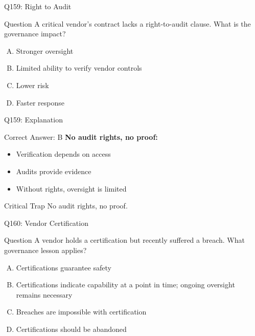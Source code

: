 \documentclass{beamer}
\begin{document}
	\begin{frame}{Q159: Right to Audit}
		\begin{block}{Question}
			A critical vendor's contract lacks a right-to-audit clause. What is the governance impact?
		\end{block}
		\begin{enumerate}[(A)]
			\item Stronger oversight
			\item Limited ability to verify vendor controls
			\item Lower risk
			\item Faster response
		\end{enumerate}
	\end{frame}
	
	\begin{frame}{Q159: Explanation}
		\begin{block}{Correct Answer: B}
			\textbf{No audit rights, no proof:}
			\begin{itemize}
				\item Verification depends on access
				\item Audits provide evidence
				\item Without rights, oversight is limited
			\end{itemize}
		\end{block}
		\begin{alertblock}{Critical Trap}
			No audit rights, no proof.
		\end{alertblock}
	\end{frame}
	
	\begin{frame}{Q160: Vendor Certification}
		\begin{block}{Question}
			A vendor holds a certification but recently suffered a breach. What governance lesson applies?
		\end{block}
		\begin{enumerate}[(A)]
			\item Certifications guarantee safety
			\item Certifications indicate capability at a point in time; ongoing oversight remains necessary
			\item Breaches are impossible with certification
			\item Certifications should be abandoned
		\end{enumerate}
	\end{frame}
	
\end{document}
